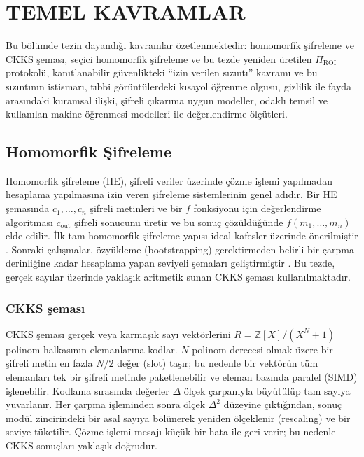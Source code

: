 \chapter{TEMEL KAVRAMLAR}\label{CH2}

Bu bölümde tezin dayandığı kavramlar özetlenmektedir: homomorfik şifreleme ve CKKS şeması, seçici homomorfik şifreleme ve bu tezde yeniden üretilen $\Pi_{\mathrm{ROI}}$ protokolü, kanıtlanabilir güvenlikteki ``izin verilen sızıntı'' kavramı ve bu sızıntının istismarı, tıbbi görüntülerdeki kısayol öğrenme olgusu, gizlilik ile fayda arasındaki kuramsal ilişki, şifreli çıkarıma uygun modeller, odaklı temsil ve kullanılan makine öğrenmesi modelleri ile değerlendirme ölçütleri.

\section{Homomorfik Şifreleme}\label{sec:he}

Homomorfik şifreleme (HE), şifreli veriler üzerinde çözme işlemi yapılmadan hesaplama yapılmasına izin veren şifreleme sistemlerinin genel adıdır. Bir HE şemasında $c_1,\ldots,c_n$ şifreli metinleri ve bir $f$ fonksiyonu için değerlendirme algoritması $c_{\mathrm{out}}$ şifreli sonucunu üretir ve bu sonuç çözüldüğünde $f(m_1,\ldots,m_n)$ elde edilir. İlk tam homomorfik şifreleme yapısı ideal kafesler üzerinde önerilmiştir \cite{gentry2009fhe}. Sonraki çalışmalar, özyükleme (bootstrapping) gerektirmeden belirli bir çarpma derinliğine kadar hesaplama yapan seviyeli şemaları geliştirmiştir \cite{brakerski2012leveled}. Bu tezde, gerçek sayılar üzerinde yaklaşık aritmetik sunan CKKS şeması kullanılmaktadır.

\subsection{CKKS şeması}\label{sec:ckks}

CKKS şeması \cite{cheon2017ckks} gerçek veya karmaşık sayı vektörlerini $R = \mathbb{Z}[X]/(X^N+1)$ polinom halkasının elemanlarına kodlar. $N$ polinom derecesi olmak üzere bir şifreli metin en fazla $N/2$ değer (slot) taşır; bu nedenle bir vektörün tüm elemanları tek bir şifreli metinde paketlenebilir ve eleman bazında paralel (SIMD) işlenebilir. Kodlama sırasında değerler $\Delta$ ölçek çarpanıyla büyütülüp tam sayıya yuvarlanır. Her çarpma işleminden sonra ölçek $\Delta^2$ düzeyine çıktığından, sonuç modül zincirindeki bir asal sayıya bölünerek yeniden ölçeklenir (rescaling) ve bir seviye tüketilir. Çözme işlemi mesajı küçük bir hata ile geri verir; bu nedenle CKKS sonuçları yaklaşık doğrudur.

